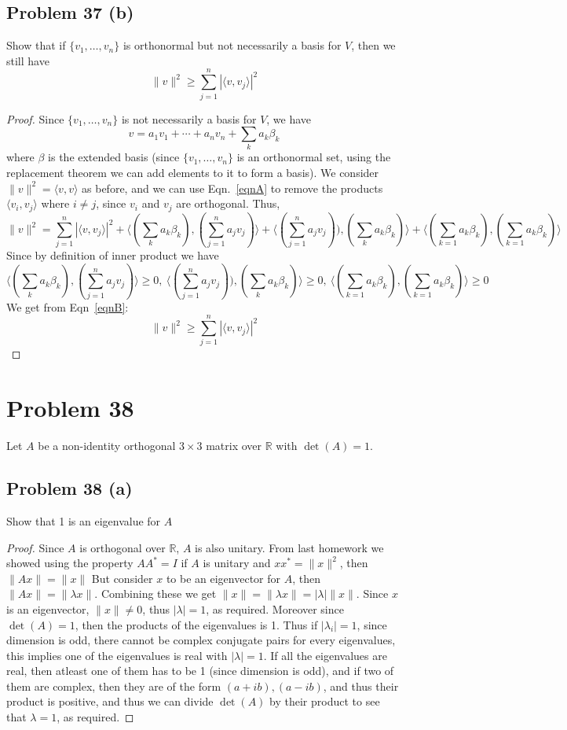 \documentclass{article}[10pt]
\def\RR{\mathbb R}
\begin{document}
\subsection{Problem 37 (b)}
Show that if $\{v_1,\ldots,v_n\}$ is
orthonormal but not necessarily a basis for $V$, then we still have
\[
\|v\|^2 \ge \sum_{j=1}^n |\langle v,v_j \rangle|^2
\]
\begin{proof}
Since $\{v_1,\ldots,v_n\}$ is not necessarily a basis for $V$, we have
\[
v = a_1v_1 + \cdots + a_nv_n + \sum_{k}a_k\beta_k
\]
where $\beta$ is the extended basis (since $\{v_1,\ldots,v_n\}$ is
an orthonormal set, using the replacement theorem we can add elements
to it to form a basis).
We consider $\|v\|^2 = \langle v,v\rangle$ as before, and we can use
Eqn.~\ref{eqnA} to remove the products $\langle v_i,v_j\rangle$ where
$i \ne j$, since $v_i$ and $v_j$ are orthogonal. Thus,
\begin{equation}
\|v\|^2 = \sum_{j=1}^n |\langle v,v_j \rangle|^2 + 
          \langle (\sum_{k}a_k\beta_k),(\sum_{j=1}^n a_jv_j ) \rangle +
          \langle (\sum_{j=1}^n a_jv_j )),(\sum_{k}a_k\beta_k) \rangle
          + \langle (\sum_{k=1}a_k\beta_k),(\sum_{k=1}a_k\beta_k) \rangle
\label{eqnB}
\end{equation}
Since by definition of inner product we have
\[
        \langle (\sum_{k}a_k\beta_k),(\sum_{j=1}^n a_jv_j ) \rangle \ge 0,\ 
        \langle (\sum_{j=1}^n a_jv_j )),(\sum_{k}a_k\beta_k) \rangle \ge 0,\ 
\langle (\sum_{k=1}a_k\beta_k),(\sum_{k=1}a_k\beta_k) \rangle \ge 0
\]
We get from Eqn~\ref{eqnB}:
\[
\|v\|^2 \ge \sum_{j=1}^n |\langle v,v_j \rangle|^2
\]
\end{proof}

\section{Problem 38} Let $A$ be a non-identity orthogonal $3\times 3$
matrix over $\RR$ with $\det(A)=1$.
\subsection{Problem 38 (a)}Show that 1 is an eigenvalue for $A$
\begin{proof}
Since $A$ is orthogonal over $\RR$, $A$ is also unitary. 
From last homework we
showed using the property $AA^*=I$ if $A$ is unitary and $xx^*=\|x\|^2$, 
then $\|Ax\|=\|x\|$
 But consider $x$ to be an eigenvector for $A$, then $\|Ax\|=\|\lambda x\|$.
Combining these we get $\|x\|=\|\lambda x\| = |\lambda|\|x\|$. Since
$x$ is an eigenvector, $\|x\|\ne 0$, thus $|\lambda|=1$, as required.
Moreover since $\det(A)=1$, then the products of the eigenvalues is 1.
Thus if $|\lambda_i|=1$, since dimension is odd, there cannot be complex
conjugate pairs for every eigenvalues, this implies one of the eigenvalues
is real with $|\lambda|=1$. If all the eigenvalues are real, then atleast
one of them has to be 1 (since dimension is odd), and if two of them are
complex, then they are of the form $(a+ib),(a-ib)$, and thus their product
is positive, and thus we can divide $\det(A)$ by their product to see that
$\lambda=1$, as required.
\end{proof}
\end{document}
